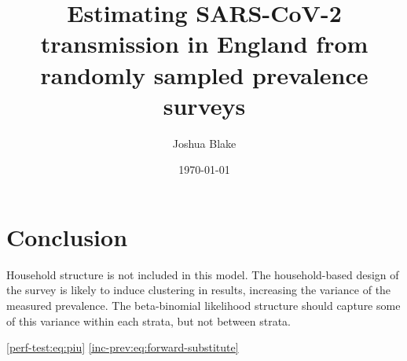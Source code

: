 \documentclass{cam-thesis}
\title{Estimating SARS-CoV-2 transmission in England from randomly sampled prevalence surveys}
\author{Joshua Blake}
\date{\today}
\begin{document}
\frontmatter{}

\listoffigures









\chapter{Conclusion}
Household structure is not included in this model.
The household-based design of the survey is likely to induce clustering in results, increasing the variance of the measured prevalence.
The beta-binomial likelihood structure should capture some of this variance within each strata, but not between strata.

\listoftodos

\newrefcontext[sorting=nyt]
\printbibliography[heading=bibintoc]

\appendix






\cref{perf-test:eq:piu}
\cref{inc-prev:eq:forward-substitute}
\end{document}
